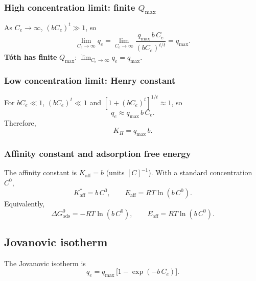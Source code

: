 \documentclass[journal=aamick,manuscript=article]{achemso}
\begin{document}
\subsubsection{High concentration limit: finite $Q_{\max}$}

As $C_e \to \infty$, $(bC_e)^t \gg 1$, so
\begin{equation}
	\lim_{C_e \to \infty} q_e
	= \lim_{C_e \to \infty}
	\frac{q_{\max}\, b\, C_e}{(b C_e)^{t/t}}
	= q_{\max}.
\end{equation}
\textbf{T\'{o}th has finite }$Q_{\max}$:\quad
$\displaystyle \lim_{C_e \to \infty} q_e = q_{\max}$.%

\subsubsection{Low concentration limit: Henry constant}

For $bC_e \ll 1$, $(bC_e)^t \ll 1$ and $[1+(bC_e)^t]^{1/t} \approx 1$, so
\begin{equation}
	q_e \approx q_{\max}\, b\, C_e.
\end{equation}
Therefore,
\begin{equation}
	\boxed{K_H = q_{\max}\, b.}
\end{equation}

\subsubsection{Affinity constant and adsorption free energy}

The affinity constant is $K_{\mathrm{aff}} = b$ (units $[C]^{-1}$). With a standard concentration $C^0$,
\begin{equation}
	K_{\mathrm{aff}}^{\ast} = b\, C^0,
	\qquad
	E_{\mathrm{aff}} = RT\ln(b\, C^0).
\end{equation}
Equivalently,
\begin{equation}
	\boxed{
		\Delta G_{\mathrm{ads}}^{0} = -RT\ln(b\, C^0),
		\qquad
		E_{\mathrm{aff}} = RT\ln(b\, C^0).
	}
\end{equation}

\subsection{Jovanovic isotherm}
\label{sec:si_jovanovic}

The Jovanovic isotherm is
\begin{equation}
	q_e = q_{\max}\,\bigl[1 - \exp(-b\, C_e)\bigr].
	\label{eq:si_jovanovic}
\end{equation}
\end{document}
